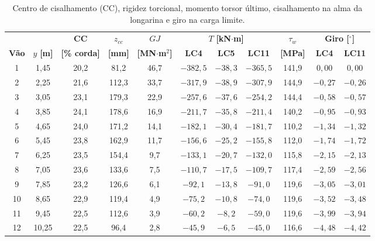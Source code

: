 \begin{table}[H]
\centering
\caption{Centro de cisalhamento (CC), rigidez torcional, momento torsor último, cisalhamento na alma da longarina e giro na carga limite.}
\label{tab:rev_torcao}
\small
\setlength{\tabcolsep}{3.5pt}
\begin{tabular}{ccccccccccc}
\toprule
 & & \textbf{CC} & \boldmath$z_{cc}$ & \boldmath$GJ$ & \multicolumn{3}{c}{\boldmath$T$ \textbf{[kN$\cdot$m]}} & \boldmath$\tau_w$ & \multicolumn{2}{c}{\textbf{Giro [$^\circ$]}} \\
\cmidrule(lr){6-8}\cmidrule(lr){10-11}
\textbf{Vão} & \boldmath$y$ \textbf{[m]} & \textbf{[\% corda]} & \textbf{[mm]} & \textbf{[MN$\cdot$m$^2$]} & \textbf{LC4} & \textbf{LC5} & \textbf{LC11} & \textbf{[MPa]} & \textbf{LC4} & \textbf{LC11} \\
\midrule
1 & 1{,}45 & 20{,}2 & 81{,}2 & 46{,}7 & $-382{,}5$ & $-38{,}3$ & $-365{,}5$ & 141{,}9 & $0{,}00$ & $0{,}00$ \\
2 & 2{,}25 & 21{,}6 & 112{,}3 & 33{,}7 & $-317{,}9$ & $-38{,}9$ & $-307{,}9$ & 144{,}9 & $-0{,}27$ & $-0{,}26$ \\
3 & 3{,}05 & 23{,}1 & 179{,}3 & 22{,}9 & $-257{,}6$ & $-37{,}6$ & $-254{,}2$ & 144{,}4 & $-0{,}58$ & $-0{,}57$ \\
4 & 3{,}85 & 24{,}1 & 178{,}6 & 16{,}9 & $-211{,}7$ & $-35{,}8$ & $-211{,}4$ & 140{,}2 & $-0{,}95$ & $-0{,}93$ \\
5 & 4{,}65 & 24{,}0 & 171{,}2 & 14{,}1 & $-182{,}1$ & $-30{,}4$ & $-181{,}7$ & 110{,}2 & $-1{,}34$ & $-1{,}32$ \\
6 & 5{,}45 & 23{,}8 & 162{,}9 & 11{,}7 & $-156{,}6$ & $-25{,}2$ & $-155{,}8$ & 112{,}0 & $-1{,}74$ & $-1{,}72$ \\
7 & 6{,}25 & 23{,}5 & 154{,}4 & 9{,}7 & $-133{,}1$ & $-20{,}7$ & $-132{,}0$ & 115{,}8 & $-2{,}15$ & $-2{,}13$ \\
8 & 7{,}05 & 23{,}6 & 133{,}6 & 7{,}5 & $-110{,}7$ & $-17{,}5$ & $-109{,}7$ & 117{,}4 & $-2{,}59$ & $-2{,}56$ \\
9 & 7{,}85 & 23{,}2 & 126{,}6 & 6{,}1 & $-92{,}1$ & $-13{,}8$ & $-91{,}0$ & 119{,}6 & $-3{,}05$ & $-3{,}01$ \\
10 & 8{,}65 & 22{,}9 & 119{,}4 & 4{,}9 & $-75{,}2$ & $-10{,}8$ & $-74{,}0$ & 119{,}6 & $-3{,}52$ & $-3{,}48$ \\
11 & 9{,}45 & 22{,}5 & 112{,}6 & 3{,}9 & $-60{,}2$ & $-8{,}2$ & $-59{,}0$ & 119{,}6 & $-3{,}99$ & $-3{,}94$ \\
12 & 10{,}25 & 22{,}5 & 96{,}4 & 2{,}8 & $-45{,}9$ & $-6{,}5$ & $-45{,}0$ & 116{,}6 & $-4{,}48$ & $-4{,}42$ \\

\end{tabular}
\end{table}

